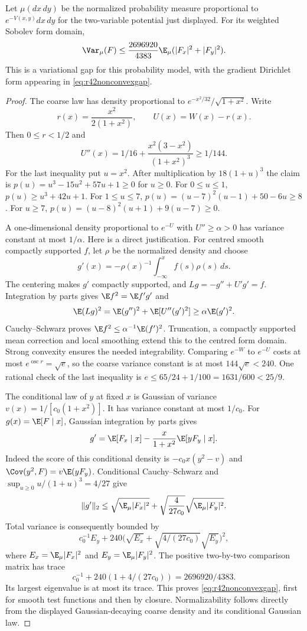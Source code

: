 \begin{proposition}\label{prop:r42nonconvex}
Let $\mu(dx\,dy)$ be the normalized probability measure proportional
to $e^{-V(x,y)}dx\,dy$ for the two-variable potential just displayed.
For its weighted Sobolev form domain,
\begin{equation}\label{eq:r42nonconvexgap}
 \Var_\mu(F)\le\frac{2696920}{4383}
                \E_\mu(|F_x|^2+|F_y|^2).
\end{equation}
This is a variational gap for this probability model, with the
gradient Dirichlet form appearing in \eqref{eq:r42nonconvexgap}.
\end{proposition}
\begin{proof}
The coarse law has density proportional to
$e^{-x^2/32}/\sqrt{1+x^2}$. Write
\[
 r(x)=\frac{x^2}{2(1+x^2)},\qquad U(x)=W(x)-r(x).
\]
Then $0\le r<1/2$ and
\[
 U''(x)=1/16+\frac{x^2(3-x^2)}{(1+x^2)^3}\ge1/144.
\]
For the last inequality put $u=x^2$. After multiplication by
$18(1+u)^3$ the claim is
$p(u)=u^3-15u^2+57u+1\ge0$ for $u\ge0$.
For $0\le u\le1$, $p(u)\ge u^3+42u+1$.
For $1\le u\le7$,
$p(u)=(u-7)^2(u-1)+50-6u\ge8$.
For $u\ge7$,
$p(u)=(u-8)^2(u+1)+9(u-7)\ge0$.

A one-dimensional density proportional to $e^{-U}$ with
$U''\ge\alpha>0$ has variance constant at most $1/\alpha$.
Here is a direct justification. For centred smooth compactly
supported $f$, let $\rho$ be the normalized density and choose
\[
 g'(x)=-\rho(x)^{-1}\int_{-\infty}^x f(s)\rho(s)\,ds.
\]
The centering makes $g'$ compactly supported, and
$Lg=-g''+U'g'=f$. Integration by parts gives
$\E f^2=\E f'g'$ and
\[
 \E(Lg)^2=\E(g'')^2+\E[U''(g')^2]\ge\alpha\E(g')^2.
\]
Cauchy--Schwarz proves $\E f^2\le\alpha^{-1}\E(f')^2$.
Truncation, a compactly supported mean correction and local smoothing
extend this to the centred form domain. Strong convexity ensures the
needed integrability. Comparing $e^{-W}$ to $e^{-U}$ costs at most
$e^{\operatorname{osc}r}=\sqrt e$, so the coarse variance constant is
at most $144\sqrt e<240$. One rational check of the last inequality
is $e\le65/24+1/100=1631/600<25/9$.

The conditional law of $y$ at fixed $x$ is Gaussian of variance
$v(x)=1/[c_0(1+x^2)]$. It has variance constant at most $1/c_0$.
For $g(x)=\E[F\mid x]$, Gaussian integration by parts gives
\[
 g'=\E[F_x\mid x]-\frac{x}{1+x^2}\E[yF_y\mid x].
\]
Indeed the score of this conditional density is
$-c_0x(y^2-v)$ and
$\Cov(y^2,F)=v\E(yF_y)$.
Conditional Cauchy--Schwarz and
$\sup_{u\ge0}u/(1+u)^3=4/27$ give
\[
 \|g'\|_2\le\sqrt{\E_\mu|F_x|^2}
        +\sqrt{\frac4{27c_0}}\sqrt{\E_\mu|F_y|^2}.
\]
Total variance is consequently bounded by
\[
 c_0^{-1}E_y+240\bigl(\sqrt{E_x}
                     +\sqrt{4/(27c_0)}\sqrt{E_y}\bigr)^2,
\]
where $E_x=\E_\mu|F_x|^2$ and $E_y=\E_\mu|F_y|^2$.
The positive two-by-two comparison matrix has trace
\[
 c_0^{-1}+240(1+4/(27c_0))=2696920/4383.
\]
Its largest eigenvalue is at most its trace. This proves
\eqref{eq:r42nonconvexgap}, first for smooth test functions and then
by closure. Normalizability follows directly from the displayed
Gaussian-decaying coarse density and its conditional Gaussian law.
\end{proof}

